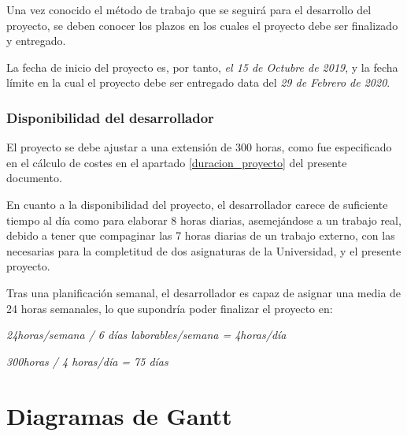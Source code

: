 \label{planificacion}

Una vez conocido el método de trabajo que se seguirá para el desarrollo del proyecto, se deben conocer los plazos en los cuales el proyecto debe ser finalizado y entregado.

La fecha de inicio del proyecto es, por tanto, \textit{el 15 de Octubre de 2019}, y la fecha límite en la cual el proyecto debe ser entregado data del \textit{29 de Febrero de 2020}.

\subsubsection{Disponibilidad del desarrollador}

El proyecto se debe ajustar a una extensión de 300 horas, como fue especificado en el cálculo de costes en el apartado \ref{duracion_proyecto} del presente documento.

En cuanto a la disponibilidad del proyecto, el desarrollador carece de suficiente tiempo  al día como para elaborar 8 horas diarias, asemejándose a un trabajo real, debido a tener que compaginar las 7 horas diarias de un trabajo externo, con las necesarias para la completitud de dos asignaturas de la Universidad, y el presente proyecto.

Tras una planificación semanal, el desarrollador es capaz de asignar una media de 24 horas semanales, lo que supondría poder finalizar el proyecto en:

\begin{center}
    \textit{24horas/semana / 6 días laborables/semana = 4horas/día }
    
    \textit{300horas / 4 horas/día = 75 días }  

\end{center}

\newpage
\section{Diagramas de Gantt}


